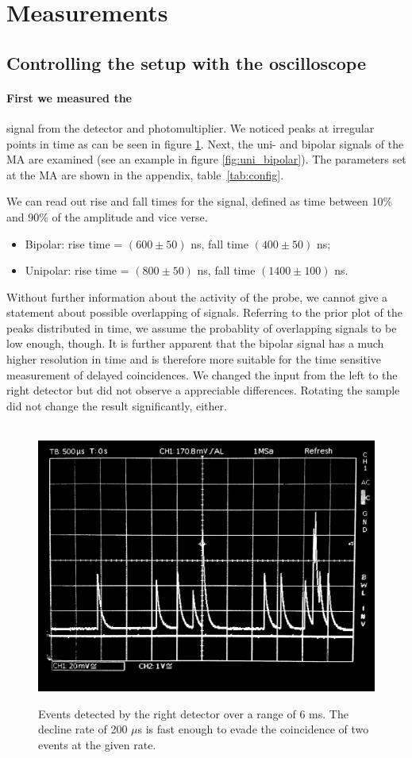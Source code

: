 \section{Measurements}
\label{sec:measurements}

\subsection{Controlling the setup with the oscilloscope}
\label{ssub:Controlling the setup with the oscilloscope}
\paragraph{First we measured the}
signal from the detector and photomultiplier. We noticed peaks at irregular points in time 
as can be seen in figure \ref{fig:osci_signal}. Next, the uni- and bipolar signals of the MA are 
examined (see an example in figure \ref{fig:uni_bipolar}). 
The parameters set at the MA are shown in the appendix, table~\ref{tab:config}. 

We can read out rise and fall times for the signal, 
defined as time between 10\% and 90\% of the amplitude and vice verse. 
\begin{itemize}
    \item
        Bipolar:    rise time = $(600 \pm 50)$ ns, fall time $(400 \pm 50)$ ns;
    \item
        Unipolar:   rise time = $(800 \pm 50)$ ns, fall time $(1400 \pm 100)$ ns.
\end{itemize}
Without further information about the activity of the probe, we cannot give a statement about 
possible overlapping of signals. Referring to the prior plot of the peaks distributed in time, we 
assume the probablity of overlapping signals to be low enough, though. 
It is further apparent that the bipolar signal has a much higher resolution in time and is therefore 
more suitable for the time sensitive measurement of delayed coincidences. 
We changed the input from the left to the right detector but did not observe a appreciable differences.
Rotating the sample did not change the result significantly, either.  
\\\\
\begin{figure}
    \begin{centering}
        \caption{
            Events detected by the right detector over a range of 6 ms. 
            The decline rate of 200 $\mu$s is fast enough to evade the 
            coincidence of two events at the given rate. 
            }
        \includegraphics[width=0.45\linewidth]{figures/osci_signal}
        \label{fig:osci_signal}
    \end{centering}
\end{figure}

